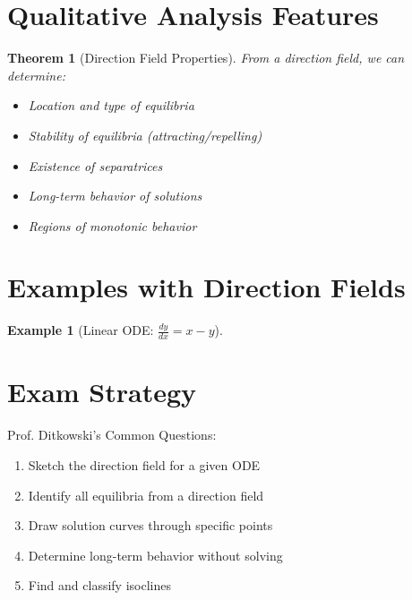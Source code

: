 \documentclass[12pt]{article}
\newtheorem{theorem}{Theorem}
\newtheorem{example}{Example}
\begin{document}
\section{Qualitative Analysis Features}

\begin{theorem}[Direction Field Properties]
From a direction field, we can determine:
\begin{itemize}
    \item Location and type of equilibria
    \item Stability of equilibria (attracting/repelling)
    \item Existence of separatrices
    \item Long-term behavior of solutions
    \item Regions of monotonic behavior
\end{itemize}
\end{theorem}

\section{Examples with Direction Fields}

\begin{example}[Linear ODE: $\frac{dy}{dx} = x - y$]
\begin{center}
\end{center}
\end{example}

\section{Exam Strategy}

\begin{keypoint}
Prof. Ditkowski's Common Questions:
\begin{enumerate}
    \item Sketch the direction field for a given ODE
    \item Identify all equilibria from a direction field
    \item Draw solution curves through specific points
    \item Determine long-term behavior without solving
    \item Find and classify isoclines
\end{enumerate}
\end{keypoint}
\end{document}
